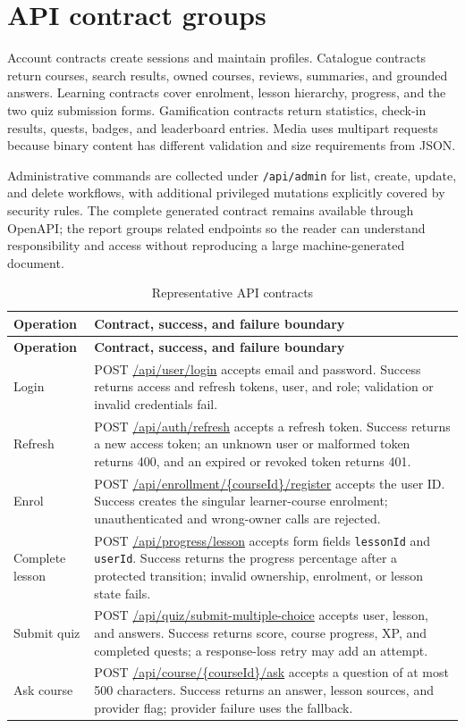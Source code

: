 \documentclass[12pt,a4paper,oneside]{report}
\begin{document}
\apiboundarydiagram

\section{API contract groups}
Account contracts create sessions and maintain profiles. Catalogue contracts return
courses, search results, owned courses, reviews, summaries, and grounded answers.
Learning contracts cover enrolment, lesson hierarchy, progress, and the two quiz
submission forms. Gamification contracts return statistics, check-in results, quests,
badges, and leaderboard entries. Media uses multipart requests because binary content
has different validation and size requirements from JSON.

Administrative commands are collected under \texttt{/api/admin} for list, create,
update, and delete workflows, with additional privileged mutations explicitly covered
by security rules. The complete generated contract remains available through OpenAPI;
the report groups related endpoints so the reader can understand responsibility and
access without reproducing a large machine-generated document.

\begin{longtable}{P{0.19\textwidth}P{0.70\textwidth}}
\caption{Representative API contracts}\label{tab:api-contracts}\\\toprule
\textbf{Operation} & \textbf{Contract, success, and failure boundary}\\\midrule\endfirsthead
\toprule\textbf{Operation} & \textbf{Contract, success, and failure boundary}\\\midrule\endhead
Login & POST \url{/api/user/login} accepts email and password. Success returns access and refresh tokens, user, and role; validation or invalid credentials fail.\\
Refresh & POST \url{/api/auth/refresh} accepts a refresh token. Success returns a new access token; an unknown user or malformed token returns 400, and an expired or revoked token returns 401.\\
Enrol & POST \url{/api/enrollment/{courseId}/register} accepts the user ID. Success creates the singular learner-course enrolment; unauthenticated and wrong-owner calls are rejected.\\
Complete lesson & POST \url{/api/progress/lesson} accepts form fields \texttt{lessonId} and \texttt{userId}. Success returns the progress percentage after a protected transition; invalid ownership, enrolment, or lesson state fails.\\
Submit quiz & POST \url{/api/quiz/submit-multiple-choice} accepts user, lesson, and answers. Success returns score, course progress, XP, and completed quests; a response-loss retry may add an attempt.\\
Ask course & POST \url{/api/course/{courseId}/ask} accepts a question of at most 500 characters. Success returns an answer, lesson sources, and provider flag; provider failure uses the fallback.\\
\bottomrule
\end{longtable}
\end{document}
